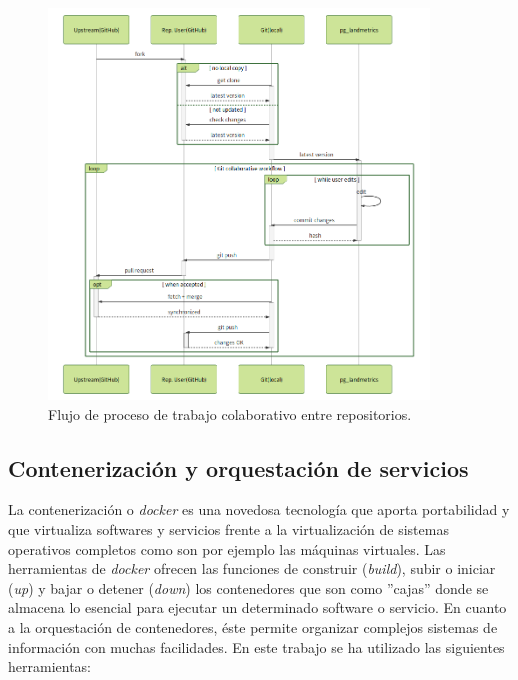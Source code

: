 \begin{figure}
\begin{center}
\includegraphics[width=0.9\textwidth]{Metodologia/Figs/pullrequest.png}
\caption{Flujo de proceso de trabajo colaborativo entre repositorios. \label{fig:pullrequest}}
\end{center}
\end{figure}


\subsection{Contenerización y orquestación de servicios}\label{subsec:conten-orquest}

La contenerización o \textit{docker} es una novedosa tecnología que aporta portabilidad y que virtualiza softwares y servicios frente a la virtualización de sistemas operativos completos como son por ejemplo las máquinas virtuales. Las herramientas de \textit{docker} ofrecen las funciones de construir (\textit{build}), subir o iniciar (\textit{up}) y bajar o detener (\textit{down}) los contenedores que son como ''cajas'' donde se almacena lo esencial para ejecutar un determinado software o servicio. En cuanto a la orquestación de contenedores, éste permite organizar complejos sistemas de información con muchas facilidades. En este trabajo se ha utilizado las siguientes herramientas:

